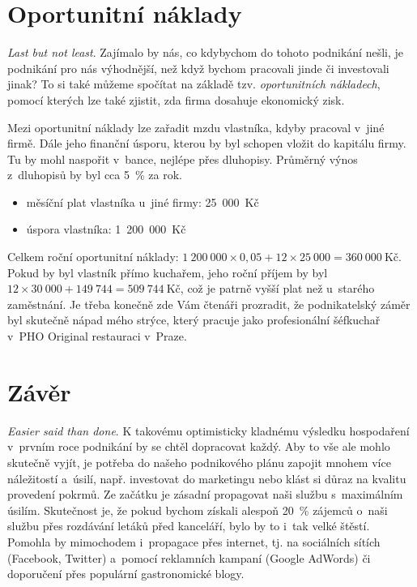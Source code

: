 \section{Oportunitní náklady}
\textit{Last but not least}. Zajímalo by nás, co kdybychom do tohoto podnikání nešli, je podnikání pro nás výhodnější, než když bychom pracovali jinde či investovali jinak? To si také můžeme spočítat na základě tzv. \textit{oportunitních nákladech}\cite{kubicek}, pomocí kterých lze také zjistit, zda firma dosahuje ekonomický zisk.

Mezi oportunitní náklady lze zařadit mzdu vlastníka, kdyby pracoval v~jiné firmě. Dále jeho finanční úsporu, kterou by byl schopen vložit do kapitálu firmy. Tu by mohl naspořit v~bance, nejlépe přes dluhopisy. Průměrný výnos z~dluhopisů by byl cca 5~\% za rok.

\begin{itemize}
\item měsíční plat vlastníka u~jiné firmy: 25~000~Kč
\item úspora vlastníka: 1~200~000~Kč
\end{itemize}

Celkem roční oportunitní náklady: $1~200~000 \times 0,05 + 12 \times 25~000 = 360~000~\text{Kč}$. Pokud by byl vlastník přímo kuchařem, jeho roční příjem by byl $12 \times 30~000 + 149~744 = 509~744~\text{Kč}$, což je patrně vyšší plat než u~starého zaměstnání. Je třeba konečně zde Vám čtenáři prozradit, že podnikatelský záměr byl skutečně nápad mého strýce, který pracuje jako profesionální šéfkuchař v~PHO Original restauraci v~Praze.

\newpage




\section*{Závěr}
\textit{Easier said than done}. K takovému optimisticky kladnému výsledku hospodaření v~prvním roce podnikání by se chtěl dopracovat každý. Aby to vše ale mohlo skutečně vyjít, je potřeba do našeho podnikového plánu zapojit mnohem více náležitostí a~úsilí, např. investovat do marketingu nebo klást si důraz na kvalitu provedení pokrmů. Ze začátku je zásadní propagovat naši službu s~maximálním úsilím. Skutečnost je, že pokud bychom získali alespoň 20~\% zájemců o~naši službu přes rozdávání letáků před kanceláří, bylo by to i~tak velké štěstí. Pomohla by mimochodem i~propagace přes internet, tj. na sociálních sítích (Facebook, Twitter) a~pomocí reklamních kampaní (Google AdWords) či doporučení přes populární gastronomické blogy.

